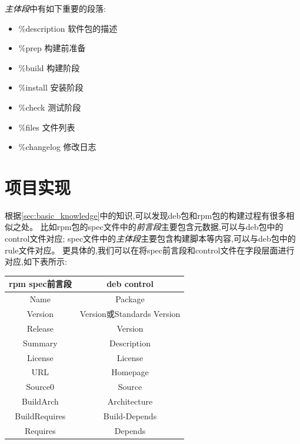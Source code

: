 \documentclass{article}
\begin{document}
\emph{主体段}中有如下重要的段落:
\begin{itemize}
    \item \%description  软件包的描述
    \item \%prep  构建前准备
    \item \%build  构建阶段
    \item \%install  安装阶段
    \item \%check  测试阶段
    \item \%files  文件列表
    \item \%changelog  修改日志
\end{itemize}

\section{项目实现}
根据\ref{sec:basic_knowledge}中的知识,可以发现deb包和rpm包的构建过程有很多相似之处。
比如rpm包的spec文件中的\emph{前言段}主要包含元数据,可以与deb包中的control文件对应;
spec文件中的\emph{主体段}主要包含构建脚本等内容,可以与deb包中的rule文件对应。
更具体的,我们可以在将spec前言段和control文件在字段层面进行对应,如下表所示:
\begin{center}
    \begin{tabular}{|c|c|}
    \hline
    rpm spec前言段 & deb control\\
    \hline
    Name & Package \\
    \hline
    Version & Version或Standards Version \\
    \hline
    Release & Version \\
    \hline
    Summary & Description \\
    \hline
    License & License \\
    \hline
    URL & Homepage \\
    \hline
    Source0 & Source \\
    \hline
    BuildArch & Architecture \\
    \hline
    BuildRequires & Build-Depends \\
    \hline
    Requires & Depends \\
    \hline
    \end{tabular}
\end{center}
\end{document}
